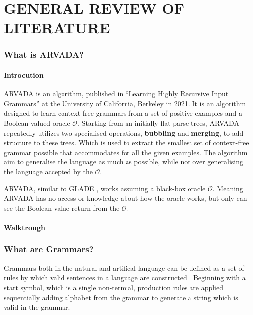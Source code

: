 \chapter{GENERAL REVIEW OF LITERATURE}

\subsection{What is ARVADA?}

\subsubsection{Introcution}

ARVADA is an algorithm, published in \enquote{Learning Highly Recursive Input Grammars} \cite{kulkarniLearningHighlyRecursive2021} at the University of California, Berkeley in 2021. It is an algorithm designed to learn context-free grammars from a set of positive examples and a Boolean-valued oracle $\mathcal{O}$. Starting from an initially flat parse trees, ARVADA repeatedly utilizes two specialised operations, \textbf{bubbling} and \textbf{merging}, to add structure to these trees. Which is used to extract the smallest set of context-free grammar possible that accommodates for all the given examples. The algorithm aim to generalise the language as much as possible, while not over generalising the language accepted by the $\mathcal{O}$.

ARVADA, similar to GLADE \cite{bastaniSynthesizingProgramInput}, works assuming a black-box oracle $\mathcal{O}$. Meaning ARVADA has no access or knowledge about how the oracle works, but only can see the Boolean value return from the $\mathcal{O}$. 

\subsubsection{Walktrough}

\subsection{What are Grammars?}

Grammars both in the natural and artifical language can be defined as a set of rules by which valid sentences in a language are constructed \cite{jiangFormalGrammarsLanguages}. Beginning with a start symbol, which is a single non-termial, production rules are applied sequentially adding alphabet from the grammar to generate a string which is valid in the grammar.

